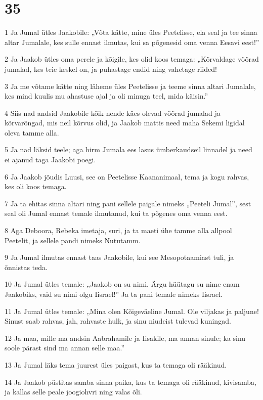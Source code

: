 \chapter{35}

\par 1 Ja Jumal ütles Jaakobile: „Võta kätte, mine üles Peetelisse, ela seal ja tee sinna altar Jumalale, kes sulle ennast ilmutas, kui sa põgenesid oma venna Eesavi eest!”
\par 2 Ja Jaakob ütles oma perele ja kõigile, kes olid koos temaga: „Kõrvaldage võõrad jumalad, kes teie keskel on, ja puhastage endid ning vahetage riided!
\par 3 Ja me võtame kätte ning läheme üles Peetelisse ja teeme sinna altari Jumalale, kes mind kuulis mu ahastuse ajal ja oli minuga teel, mida käisin.”
\par 4 Siis nad andsid Jaakobile kõik nende käes olevad võõrad jumalad ja kõrvarõngad, mis neil kõrvus olid, ja Jaakob mattis need maha Sekemi ligidal oleva tamme alla.
\par 5 Ja nad läksid teele; aga hirm Jumala ees lasus ümberkaudseil linnadel ja need ei ajanud taga Jaakobi poegi.
\par 6 Ja Jaakob jõudis Luusi, see on Peetelisse Kaananimaal, tema ja kogu rahvas, kes oli koos temaga.
\par 7 Ja ta ehitas sinna altari ning pani sellele paigale nimeks „Peeteli Jumal”, sest seal oli Jumal ennast temale ilmutanud, kui ta põgenes oma venna eest.
\par 8 Aga Deboora, Rebeka imetaja, suri, ja ta maeti ühe tamme alla allpool Peetelit, ja sellele pandi nimeks Nututamm.
\par 9 Ja Jumal ilmutas ennast taas Jaakobile, kui see Mesopotaamiast tuli, ja õnnistas teda.
\par 10 Ja Jumal ütles temale: „Jaakob on su nimi. Ärgu hüütagu su nime enam Jaakobiks, vaid su nimi olgu Iisrael!” Ja ta pani temale nimeks Iisrael.
\par 11 Ja Jumal ütles temale: „Mina olen Kõigeväeline Jumal. Ole viljakas ja paljune! Sinust saab rahvas, jah, rahvaste hulk, ja sinu niudeist tulevad kuningad.
\par 12 Ja maa, mille ma andsin Aabrahamile ja Iisakile, ma annan sinule; ka sinu soole pärast sind ma annan selle maa.”
\par 13 Ja Jumal läks tema juurest üles paigast, kus ta temaga oli rääkinud.
\par 14 Ja Jaakob püstitas samba sinna paika, kus ta temaga oli rääkinud, kivisamba, ja kallas selle peale joogiohvri ning valas õli.
